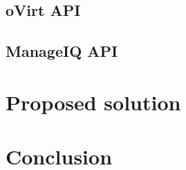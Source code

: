 \section{oVirt API}
\section{ManageIQ API}




\chapter{Proposed solution}



\chapter{Conclusion}

